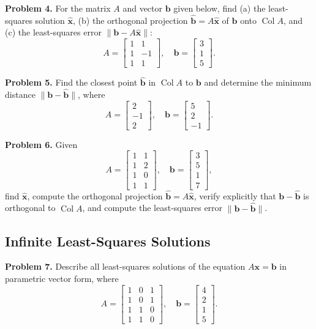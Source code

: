 \documentclass[11pt, letterpaper]{article}
\theoremstyle{definition}
\theoremstyle{remark}
\begin{document}
\textbf{Problem 4.} For the matrix $A$ and vector $\mathbf{b}$ given below, find (a) the least-squares solution $\hat{\mathbf{x}}$, (b) the orthogonal projection $\hat{\mathbf{b}} = A\hat{\mathbf{x}}$ of $\mathbf{b}$ onto $\operatorname{Col} A$, and (c) the least-squares error $\|\mathbf{b} - A\hat{\mathbf{x}}\|$:
\[
A = \begin{bmatrix} 1 & 1 \\ 1 & -1 \\ 1 & 1 \end{bmatrix}, \quad \mathbf{b} = \begin{bmatrix} 3 \\ 1 \\ 5 \end{bmatrix}.
\]

\textbf{Problem 5.} Find the closest point $\hat{\mathbf{b}}$ in $\operatorname{Col} A$ to $\mathbf{b}$ and determine the minimum distance $\|\mathbf{b} - \hat{\mathbf{b}}\|$, where
\[
A = \begin{bmatrix} 2 \\ -1 \\ 2 \end{bmatrix}, \quad \mathbf{b} = \begin{bmatrix} 5 \\ 2 \\ -1 \end{bmatrix}.
\]

\textbf{Problem 6.} Given
\[
A = \begin{bmatrix} 1 & 1 \\ 1 & 2 \\ 1 & 0 \\ 1 & 1 \end{bmatrix}, \quad \mathbf{b} = \begin{bmatrix} 3 \\ 5 \\ 1 \\ 7 \end{bmatrix},
\]
find $\hat{\mathbf{x}}$, compute the orthogonal projection $\hat{\mathbf{b}} = A\hat{\mathbf{x}}$, verify explicitly that $\mathbf{b} - \hat{\mathbf{b}}$ is orthogonal to $\operatorname{Col} A$, and compute the least-squares error $\|\mathbf{b} - \hat{\mathbf{b}}\|$.

\subsection{Infinite Least-Squares Solutions}

\textbf{Problem 7.} Describe all least-squares solutions of the equation $A\mathbf{x} = \mathbf{b}$ in parametric vector form, where
\[
A = \begin{bmatrix} 1 & 0 & 1 \\ 1 & 0 & 1 \\ 1 & 1 & 0 \\ 1 & 1 & 0 \end{bmatrix}, \quad \mathbf{b} = \begin{bmatrix} 4 \\ 2 \\ 1 \\ 5 \end{bmatrix}.
\]
\end{document}
